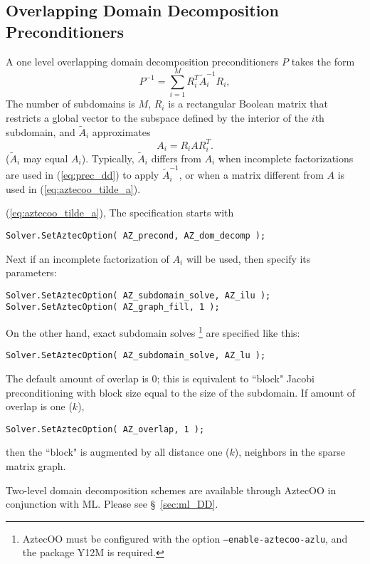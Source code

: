 \subsection{Overlapping Domain Decomposition Preconditioners}
\label{sec:aztecoo_dd}
A one level overlapping domain decomposition preconditioners $P$ takes the form
\begin{equation}
  \label{eq:prec_dd}
  P^{-1} = \sum_{i=1}^M R_i^T \tilde{A}_i^{-1} R_i,
\end{equation}
The number of subdomains is $M$, 
$R_i$ is a rectangular Boolean matrix that restricts
a global vector to the subspace defined by the interior of the $i$th
subdomain, and $\tilde{A}_i$ approximates
\begin{equation}
  \label{eq:aztecoo_tilde_a}
  A_i = R_i A R_i^T .
\end{equation}
($\tilde{A}_i$ may equal $A_i$). Typically, $\tilde{A}_i$ differs
from $A_i$ when incomplete factorizations are used in (\ref{eq:prec_dd})
to apply $\tilde{A}_i^{-1}$, or when a matrix different from $A$ is used
in (\ref{eq:aztecoo_tilde_a}).

(\ref{eq:aztecoo_tilde_a}),
The specification starts with
\begin{verbatim}
Solver.SetAztecOption( AZ_precond, AZ_dom_decomp );
\end{verbatim}
Next if an incomplete factorization of $A_i$ will be used, then specify its parameters:
\begin{verbatim}
Solver.SetAztecOption( AZ_subdomain_solve, AZ_ilu );
Solver.SetAztecOption( AZ_graph_fill, 1 );
\end{verbatim}
On the other hand, exact subdomain solves 
\footnote{AztecOO must be
  configured with the option {\tt --enable-aztecoo-azlu}, and the
  package Y12M is required.}
are specified like this:
\begin{verbatim}
Solver.SetAztecOption( AZ_subdomain_solve, AZ_lu );
\end{verbatim}

The default amount of overlap is $0$; this is equivalent to
``block" Jacobi preconditioning with block size equal to the size of the subdomain. 
If amount of overlap is one ($k$),
\begin{verbatim}
Solver.SetAztecOption( AZ_overlap, 1 );
\end{verbatim}
then the ``block" is augmented by all distance one ($k$),
neighbors in the sparse matrix graph.

\begin{remark} 
  Two-level domain decomposition schemes \cite{smbg:96}
are available through AztecOO in conjunction with ML.
Please see \S~\ref{sec:ml_DD}.
\end{remark}

